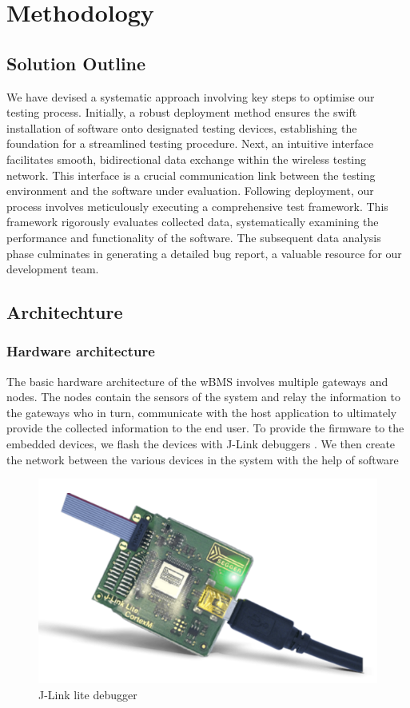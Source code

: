\chapter{Methodology} %

\label{ch:meth}


\section{Solution Outline}
We have devised a systematic approach involving key steps to optimise our testing process. Initially, a robust deployment method ensures the swift installation of software onto designated testing devices, establishing the foundation for a streamlined testing procedure. Next, an intuitive interface facilitates smooth, bidirectional data exchange within the wireless testing network. This interface is a crucial communication link between the testing environment and the software under evaluation.
Following deployment, our process involves meticulously executing a comprehensive test framework. This framework rigorously evaluates collected data, systematically examining the performance and functionality of the software. The subsequent data analysis phase culminates in generating a detailed bug report, a valuable resource for our development team.

\section{Architechture}
\subsection{Hardware architecture}
The basic hardware architecture of the wBMS involves multiple gateways and nodes. The nodes contain the sensors of the system and relay the information to the gateways who in turn, communicate with the host application to ultimately provide the collected information to the end user.
To provide the firmware to the embedded devices, we flash the devices with J-Link debuggers \cite{jlink}. We then create the network between the various devices in the system with the help of software
\begin{figure}[ht]
    \centering
    \includegraphics[scale=0.5]{../Figures/jlink.png}
    \caption{J-Link lite debugger}
    \label{fig:jlink}
\end{figure}

